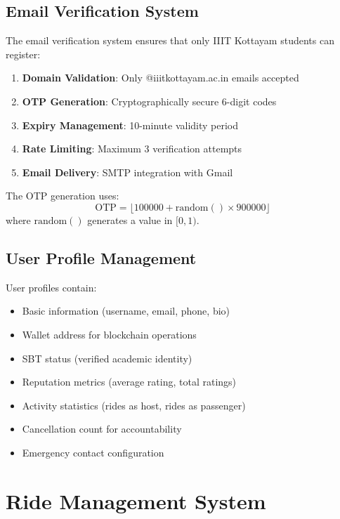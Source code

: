 \documentclass[12pt]{report}
\theoremstyle{plain}
\theoremstyle{definition}
\theoremstyle{remark}
\begin{document}
\subsection{Email Verification System}

The email verification system ensures that only IIIT Kottayam students can register:

\begin{enumerate}
    \item \textbf{Domain Validation}: Only @iiitkottayam.ac.in emails accepted
    \item \textbf{OTP Generation}: Cryptographically secure 6-digit codes
    \item \textbf{Expiry Management}: 10-minute validity period
    \item \textbf{Rate Limiting}: Maximum 3 verification attempts
    \item \textbf{Email Delivery}: SMTP integration with Gmail
\end{enumerate}

The OTP generation uses:
\begin{equation}
\text{OTP} = \lfloor 100000 + \text{random}() \times 900000 \rfloor
\end{equation}
where $\text{random}()$ generates a value in $[0, 1)$.

\subsection{User Profile Management}

User profiles contain:

\begin{itemize}
    \item Basic information (username, email, phone, bio)
    \item Wallet address for blockchain operations
    \item SBT status (verified academic identity)
    \item Reputation metrics (average rating, total ratings)
    \item Activity statistics (rides as host, rides as passenger)
    \item Cancellation count for accountability
    \item Emergency contact configuration
\end{itemize}

\section{Ride Management System}
\end{document}
